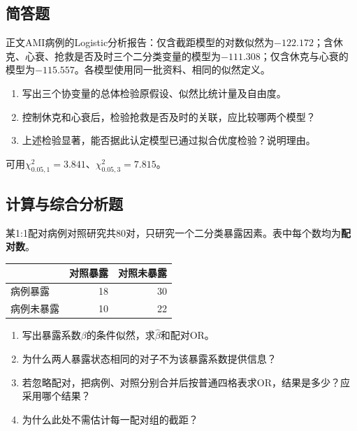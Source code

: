 \par\addvspace{8pt}\noindent\begin{minipage}{\linewidth}

\subsection{简答题}


正文AMI病例的Logistic分析报告：仅含截距模型的对数似然为\(-122.172\)；含休克、心衰、抢救是否及时三个二分类变量的模型为\(-111.308\)；仅含休克与心衰的模型为\(-115.557\)。各模型使用同一批资料、相同的似然定义。
\begin{enumerate}
\item 写出三个协变量的总体检验原假设、似然比统计量及自由度。
\item 控制休克和心衰后，检验抢救是否及时的关联，应比较哪两个模型？
\item 上述检验显著，能否据此认定模型已通过拟合优度检验？说明理由。
\end{enumerate}
可用\(\chi^2_{0.05,1}=3.841\)、\(\chi^2_{0.05,3}=7.815\)。


\end{minipage}\par\vspace{5pt}

\par\addvspace{8pt}\noindent\begin{minipage}{\linewidth}

\subsection{计算与综合分析题}


某1:1配对病例对照研究共80对，只研究一个二分类暴露因素。表中每个数均为\textbf{配对数}。
\begin{center}\begin{tabular}{lrr}\toprule
 & 对照暴露 & 对照未暴露\\\midrule
病例暴露 & 18 & 30\\
病例未暴露 & 10 & 22\\\bottomrule
\end{tabular}\end{center}
\begin{enumerate}
\item 写出暴露系数\(\beta\)的条件似然，求\(\hat\beta\)和配对OR。
\item 为什么两人暴露状态相同的对子不为该暴露系数提供信息？
\item 若忽略配对，把病例、对照分别合并后按普通四格表求OR，结果是多少？应采用哪个结果？
\item 为什么此处不需估计每一配对组的截距？
\end{enumerate}


\end{minipage}\par\vspace{5pt}

